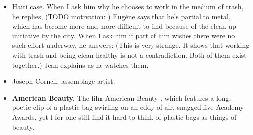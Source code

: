 \begin{itemize}

\item Haiti case. When I ask him why he chooses to work in the medium of trash, he replies,  (TODO motivation: ) Eugène says that he’s partial to metal, which has become more and more difficult to find because of the clean-up initiative by the city. When I ask him if part of him wishes there were no such effort underway, he answers:  (This is very strange. It shows that working with trash and being clean healthy is not a contradiction. Both of them exist together.)  Jean explains as he watches them.


\item Joseph Cornell, assemblage artist.

\item \textbf{American Beauty.} The film American Beauty , which features a long, poetic clip of a plastic bag swirling on an eddy of air, snagged five Academy Awards, yet I for one still find it hard to think of plastic bags as things of beauty. 


\end{itemize}
